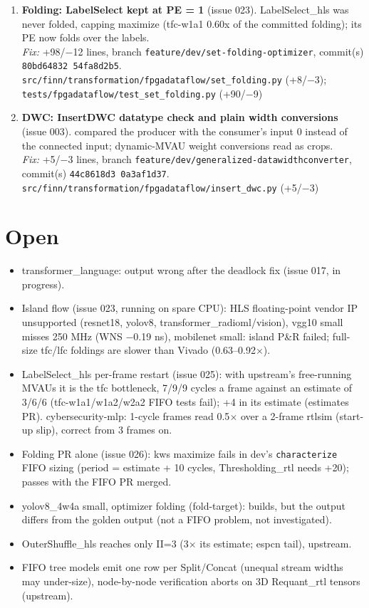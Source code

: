 \documentclass[a4paper,10pt]{article}
\begin{document}
\begin{enumerate}
\emph{Fix:} +96/$-$13 lines, branch \texttt{feature/dev/set-folding-optimizer}, commit(s) \texttt{00951c1e7 f3e0dfade}.\\
{\footnotesize \texttt{src/finn/transformation/fpgadataflow/set\_folding.py} (+96/$-$13)}
\item \textbf{Folding: LabelSelect kept at PE = 1} (issue 023). LabelSelect\_hls was never folded, capping maximize (tfc-w1a1 0.60x of the committed folding); its PE now folds over the labels.\\
\emph{Fix:} +98/$-$12 lines, branch \texttt{feature/dev/set-folding-optimizer}, commit(s) \texttt{80bd64832 54fa8d2b5}.\\
{\footnotesize \texttt{src/finn/transformation/fpgadataflow/set\_folding.py} (+8/$-$3); \texttt{tests/fpgadataflow/test\_set\_folding.py} (+90/$-$9)}
\item \textbf{DWC: InsertDWC datatype check and plain width conversions} (issue 003). compared the producer with the consumer's input 0 instead of the connected input; dynamic-MVAU weight conversions read as crops.\\
\emph{Fix:} +5/$-$3 lines, branch \texttt{feature/dev/generalized-datawidthconverter}, commit(s) \texttt{44c8618d3 0a3af1d37}.\\
{\footnotesize \texttt{src/finn/transformation/fpgadataflow/insert\_dwc.py} (+5/$-$3)}
\end{enumerate}
\section*{Open}
\begin{itemize}
\item transformer\_language: output wrong after the deadlock fix (issue 017, in progress).
\item Island flow (issue 023, running on spare CPU): HLS floating-point vendor IP unsupported (resnet18, yolov8, transformer\_radioml/vision), vgg10 small misses 250 MHz (WNS $-$0.19 ns), mobilenet small: island P\&R failed; full-size tfc/lfc foldings are slower than Vivado (0.63--0.92$\times$).
\item LabelSelect\_hls per-frame restart (issue 025): with upstream's free-running MVAUs it is the tfc bottleneck, 7/9/9 cycles a frame against an estimate of 3/6/6 (tfc-w1a1/w1a2/w2a2 FIFO tests fail); +4 in its estimate (estimates PR). cybersecurity-mlp: 1-cycle frames read 0.5$\times$ over a 2-frame rtlsim (start-up slip), correct from 3 frames on.
\item Folding PR alone (issue 026): kws maximize fails in dev's \texttt{characterize} FIFO sizing (period = estimate + 10 cycles, Thresholding\_rtl needs +20); passes with the FIFO PR merged.
\item yolov8\_4w4a small, optimizer folding (fold-target): builds, but the output differs from the golden output (not a FIFO problem, not investigated).
\item OuterShuffle\_hls reaches only II=3 (3$\times$ its estimate; espcn tail), upstream.
\item FIFO tree models emit one row per Split/Concat (unequal stream widths may under-size), node-by-node verification aborts on 3D Requant\_rtl tensors (upstream).
\end{itemize}
\end{document}
